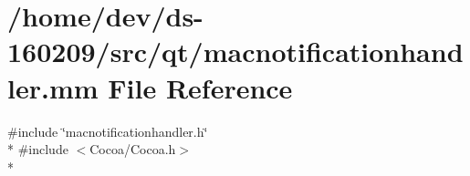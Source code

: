 \hypertarget{macnotificationhandler_8mm}{}\section{/home/dev/ds-\/160209/src/qt/macnotificationhandler.mm File Reference}
\label{macnotificationhandler_8mm}
{\ttfamily \#include \char`\"{}macnotificationhandler.\+h\char`\"{}}\\*
{\ttfamily \#include $<$Cocoa/\+Cocoa.\+h$>$}\\*
